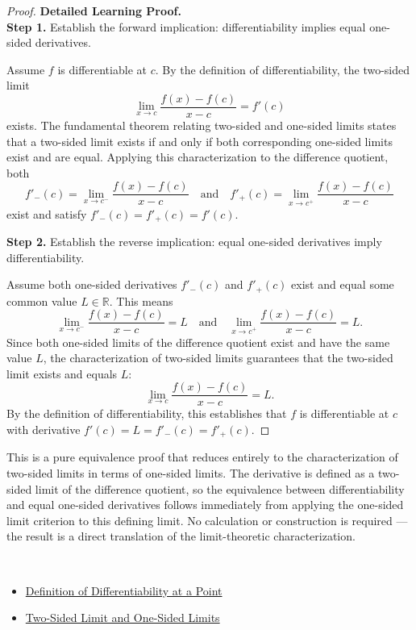 \begin{proof}
\textbf{Detailed Learning Proof.}~\\

\textbf{Step 1.} Establish the forward implication: differentiability implies equal one-sided derivatives.

Assume $f$ is differentiable at $c$. By the definition of differentiability, the two-sided limit
\[
\lim_{x \to c} \frac{f(x) - f(c)}{x - c} = f'(c)
\]
exists. The fundamental theorem relating two-sided and one-sided limits states that a two-sided limit exists if and only if both corresponding one-sided limits exist and are equal. Applying this characterization to the difference quotient, both
\[
f'_-(c) = \lim_{x \to c^-} \frac{f(x) - f(c)}{x - c} \quad \text{and} \quad f'_+(c) = \lim_{x \to c^+} \frac{f(x) - f(c)}{x - c}
\]
exist and satisfy $f'_-(c) = f'_+(c) = f'(c)$.

\textbf{Step 2.} Establish the reverse implication: equal one-sided derivatives imply differentiability.

Assume both one-sided derivatives $f'_-(c)$ and $f'_+(c)$ exist and equal some common value $L \in \mathbb{R}$. This means
\[
\lim_{x \to c^-} \frac{f(x) - f(c)}{x - c} = L \quad \text{and} \quad \lim_{x \to c^+} \frac{f(x) - f(c)}{x - c} = L.
\]
Since both one-sided limits of the difference quotient exist and have the same value $L$, the characterization of two-sided limits guarantees that the two-sided limit exists and equals $L$:
\[
\lim_{x \to c} \frac{f(x) - f(c)}{x - c} = L.
\]
By the definition of differentiability, this establishes that $f$ is differentiable at $c$ with derivative $f'(c) = L = f'_-(c) = f'_+(c)$.
\end{proof}

\begin{remark*}
This is a pure equivalence proof that reduces entirely to the characterization of two-sided limits in terms of one-sided limits. The derivative is defined as a two-sided limit of the difference quotient, so the equivalence between differentiability and equal one-sided derivatives follows immediately from applying the one-sided limit criterion to this defining limit. No calculation or construction is required — the result is a direct translation of the limit-theoretic characterization.
\end{remark*}

\begin{remark*}[Dependencies]~\\
\begin{itemize}
  \item \hyperref[def:derivative-at-point]{Definition of Differentiability at a Point}
  \item \hyperref[thm:two-sided-one-sided-limits]{Two-Sided Limit and One-Sided Limits}
\end{itemize}
\end{remark*}